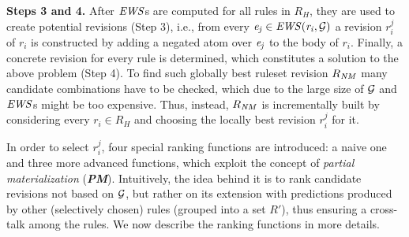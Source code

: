 \noindent \textbf{Steps 3 and 4.} After $\mathit{EWS}$s are computed for all rules in $R_H$, they are used
 to create potential revisions (Step 3), i.e., from every $\mathit{e_j}\in \mathit{EWS(r_i,\mathcal{G})}$ a revision $r^j_i$ of $r_i$ is constructed by adding a negated atom over $\mathit{e_j}$ to the body of $r_i$. Finally, a concrete revision for every rule is determined, %
which constitutes a solution to the above problem (Step 4). To find such globally best ruleset revision $R_{\mathit{NM}}$ many candidate combinations have to be checked, which due to the large size of %
 $\mathcal{G}$ and $\mathit{EWS}$s might be too expensive. Thus, instead, $R_{\mathit{NM}}$ %
is incrementally built by considering every $r_i \in
R_{H}$ and choosing the locally best revision $r^j_i$ %
for it.

In order to select %
$r^j_i$, four special ranking functions are introduced: a naive one and three more advanced functions, which exploit the concept of \emph{partial materialization} (\textbf{\em PM}). Intuitively, the idea behind it is to rank candidate revisions not based on $\mathcal{G}$, but rather on its extension with predictions produced by other (selectively chosen) rules (grouped into a set $R'$), thus ensuring a cross-talk among the rules. We now describe the ranking functions in more details.

